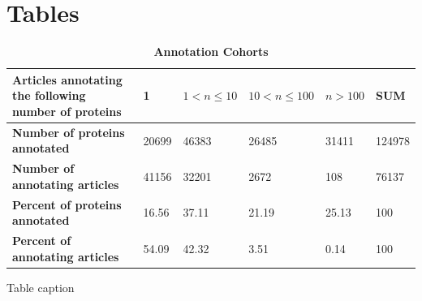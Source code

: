 \documentclass[12pt]{article}
\begin{document}
\section*{Tables}

\label{tab:top50}
\newpage

\begin{table}[!ht]
\caption{
\bf{Annotation Cohorts}}
\begin{tabular}{||p{5cm}||l|l|l|l||l||}
\hline
Articles annotating the following number of proteins & 1 & $1<n\le 10$ & $10<n\le 100$ & $n>100$ 
& SUM \\ \hline
\textbf{Number of proteins annotated} & 20699 & 46383 & 26485 & 31411 & 124978 \\ \hline
\textbf{Number of annotating articles} & 41156 & 32201 & 2672 & 108 &  76137 \\ \hline
\textbf{Percent of proteins annotated} & 16.56 & 37.11 & 21.19 & 25.13 & 100 \\ \hline
\textbf{Percent of annotating articles} & 54.09 & 42.32 & 3.51 & 0.14 & 100 \\ \hline 
\end{tabular}
\begin{flushleft}Table caption
\end{flushleft}
\label{tab:cohorts}
\end{table}
\newpage
\end{document}
